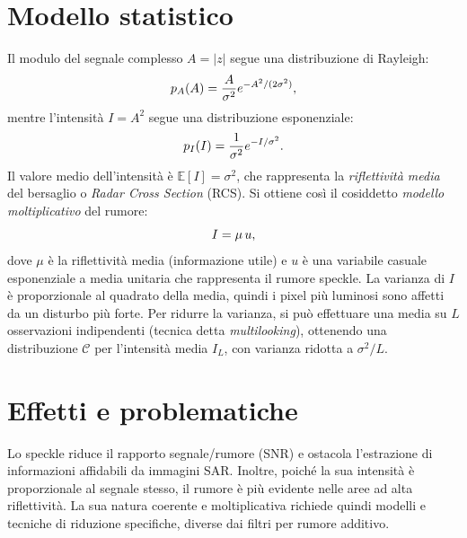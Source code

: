\section{Modello statistico}
Il modulo del segnale complesso $A = |z|$ segue una distribuzione di Rayleigh:
\begin{equation}
  \makebox[\textwidth][c]{%
    $\displaystyle
    p_A(A) = \frac{A}{\sigma^2} e^{-A^2 / (2\sigma^2)},
    $%
  }
\end{equation}
mentre l’intensità $I = A^2$ segue una distribuzione esponenziale:
\begin{equation}
  \makebox[\textwidth][c]{%
    $\displaystyle
    p_I(I) = \frac{1}{\sigma^2} e^{-I / \sigma^2}.
    $%
  }
\end{equation}
Il valore medio dell’intensità è $\mathbb{E}[I] = \sigma^2$, che rappresenta la \emph{riflettività media} del bersaglio o \emph{Radar Cross Section} (RCS).  
Si ottiene così il cosiddetto \emph{modello moltiplicativo} del rumore:
\begin{equation}
  \makebox[\textwidth][c]{%
    $\displaystyle
    I = \mu \, u,
    $%
  }
\end{equation}
dove $\mu$ è la riflettività media (informazione utile) e $u$ è una variabile casuale esponenziale a media unitaria che rappresenta il rumore speckle.  
La varianza di $I$ è proporzionale al quadrato della media, quindi i pixel più luminosi sono affetti da un disturbo più forte.
Per ridurre la varianza, si può effettuare una media su $L$ osservazioni indipendenti (tecnica detta \emph{multilooking}), ottenendo una distribuzione $\mathcal{C}$ per l’intensità media $I_L$, con varianza ridotta a $\sigma^2 / L$.
\section{Effetti e problematiche}
Lo speckle riduce il rapporto segnale/rumore (SNR) e ostacola l’estrazione di informazioni affidabili da immagini SAR.  
Inoltre, poiché la sua intensità è proporzionale al segnale stesso, il rumore è più evidente nelle aree ad alta riflettività.  
La sua natura coerente e moltiplicativa richiede quindi modelli e tecniche di riduzione specifiche, diverse dai filtri per rumore additivo.

